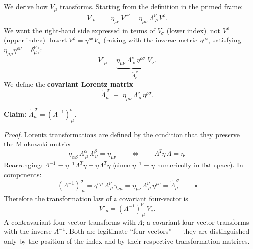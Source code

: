 We derive how $V_\mu$ transforms.  Starting from the definition in the primed
frame:
\begin{align}
    V'_\mu
    &= \eta_{\mu\nu}\,V'^\nu
     = \eta_{\mu\nu}\,\Lambda^\nu_{\ \rho}\,V^\rho .
     \label{eq:lec06:cov-step1}
\end{align}
We want the right-hand side expressed in terms of $V_\sigma$ (lower index),
not $V^\rho$ (upper index).  Insert $V^\rho = \eta^{\rho\sigma}V_\sigma$
(raising with the inverse metric $\eta^{\mu\nu}$, satisfying
$\eta_{\mu\rho}\eta^{\rho\nu}=\delta^\nu_\mu$):
\begin{equation}\label{eq:lec06:cov-step2}
    V'_\mu
    = \underbrace{\eta_{\mu\nu}\,\Lambda^\nu_{\ \rho}\,\eta^{\rho\sigma}}_{\displaystyle\equiv\;\tilde\Lambda_\mu^{\ \sigma}}\;
      V_\sigma .
\end{equation}
We define the \textbf{covariant Lorentz matrix}
\begin{equation}\label{eq:lec06:lambda-covariant}
    \tilde\Lambda_\mu^{\ \sigma}
    \;\equiv\;
    \eta_{\mu\nu}\,\Lambda^\nu_{\ \rho}\,\eta^{\rho\sigma} .
\end{equation}

\textbf{Claim:} $\tilde\Lambda_\mu^{\ \sigma} = (\Lambda^{-1})^\sigma_{\ \mu}$.

\textit{Proof.}  Lorentz transformations are defined by the condition that
they preserve the Minkowski metric:
\begin{equation}\label{eq:lec06:lorentz-condition}
    \eta_{\alpha\beta}\,\Lambda^\alpha_{\ \mu}\,\Lambda^\beta_{\ \nu}
    = \eta_{\mu\nu}
    \qquad\Longleftrightarrow\qquad
    \Lambda^T\eta\,\Lambda = \eta .
\end{equation}
Rearranging: $\Lambda^{-1} = \eta^{-1}\Lambda^T\eta = \eta\Lambda^T\eta$
(since $\eta^{-1}=\eta$ numerically in flat space).  In components:
\begin{equation}\label{eq:lec06:lambda-inverse-proof}
    (\Lambda^{-1})^\sigma_{\ \mu}
    = \eta^{\sigma\rho}\,\Lambda^\nu_{\ \rho}\,\eta_{\nu\mu}
    = \eta_{\mu\nu}\,\Lambda^\nu_{\ \rho}\,\eta^{\rho\sigma}
    = \tilde\Lambda_\mu^{\ \sigma} .
    \qquad \square
\end{equation}
Therefore the transformation law of a covariant four-vector is
\begin{equation}\label{eq:lec06:covariant-final}
    \boxed{V'_\mu = (\Lambda^{-1})^\nu_{\ \mu}\,V_\nu .}
\end{equation}
A contravariant four-vector transforms with $\Lambda$; a covariant four-vector
transforms with the inverse $\Lambda^{-1}$.  Both are legitimate
``four-vectors'' — they are distinguished only by the position of the index
and by their respective transformation matrices.


